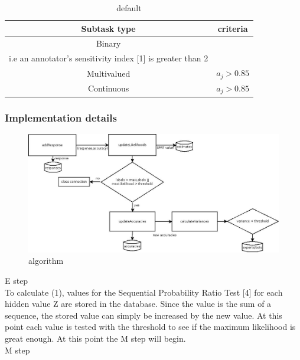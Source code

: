 \documentclass[11pt]{article}
\begin{document}
\begin{table}[htdp]
\caption{default}
\begin{center}
\begin{tabular}{|c|c|}
Subtask type & criteria\\ \hline
Binary & \shortstack{$\frac{\Phi^{-1}(a_{j}^{0}) - \Phi^{-1}(1 - a_{j}^{1})}{2} > 2$ \\ i.e an annotator's sensitivity index [1] is greater than 2}\\
Multivalued & $a_{j} > 0.85$\\ 
Continuous & $a_{j} > 0.85$\\
\end{tabular}
\end{center}
\label{default}
\end{table}%

\subsubsection{Implementation details}

\begin{figure}[htbp]
\begin{center}
\includegraphics[width=\linewidth]{flow.jpg}
\caption{algorithm}
\label{default}
\end{center}
\end{figure}


E step\\

To calculate (1), values for the Sequential Probability Ratio Test [4] for each hidden value Z are stored in the database. Since the value is the sum of a sequence, the stored value can simply be increased by the new value. At this point each value is tested with the threshold to see if the maximum likelihood is great enough. At this point the M step will begin.\\

M step\\
\end{document}
